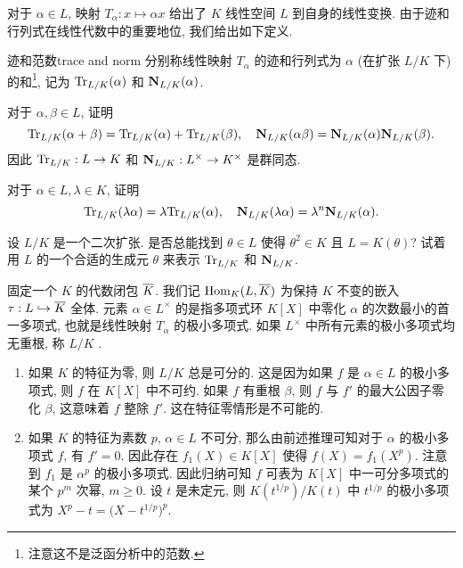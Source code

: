 对于 $\alpha\in L$, 映射 $T_\alpha:x\mapsto \alpha x$ 给出了 $K$ 线性空间 $L$ 到自身的线性变换.
由于迹和行列式在线性代数中的重要地位, 我们给出如下定义.

\begin{definition}{迹和范数}{trace and norm}
分别称线性映射 $T_\alpha$ 的迹和行列式为 $\alpha$ (在扩张 $L/K$ 下)的和\footnote{注意这不是泛函分析中的范数.}, 记为 ${\mathrm{Tr}}_{L/K}(\alpha)$ 和 ${\mathbf{N}}_{L/K}(\alpha)$.
\end{definition}

\begin{exercise}
对于 $\alpha,\beta\in L$, 证明
  \[{\mathrm{Tr}}_{L/K}(\alpha+\beta)={\mathrm{Tr}}_{L/K}(\alpha)+{\mathrm{Tr}}_{L/K}(\beta),\quad
  {\mathbf{N}}_{L/K}(\alpha\beta)={\mathbf{N}}_{L/K}(\alpha){\mathbf{N}}_{L/K}(\beta).\]
因此 ${\mathrm{Tr}}_{L/K}:L\to K$ 和 ${\mathbf{N}}_{L/K}:L^\times\to K^\times$ 是群同态.
\end{exercise}

\begin{exercise}
对于 $\alpha\in L,\lambda\in K$, 证明
  \[{\mathrm{Tr}}_{L/K}(\lambda\alpha)=\lambda{\mathrm{Tr}}_{L/K}(\alpha),\quad
  {\mathbf{N}}_{L/K}(\lambda\alpha)=\lambda^n{\mathbf{N}}_{L/K}(\alpha).\]
\end{exercise}

\begin{exercise}
设 $L/K$ 是一个二次扩张. 是否总能找到 $\theta\in L$ 使得 $\theta^2\in K$ 且 $L=K(\theta)$? 试着用 $L$ 的一个合适的生成元 $\theta$ 来表示 ${\mathrm{Tr}}_{L/K}$ 和 ${\mathbf{N}}_{L/K}$.
\end{exercise}

固定一个 $K$ 的代数闭包 $\overline K$. 我们记 ${\mathrm{Hom}}_K(L,\overline K)$ 为保持 $K$ 不变的嵌入 $\tau:L\hookrightarrow\overline K$ 全体. 元素 $\alpha\in L^\times$ 的是指多项式环 $K[X]$ 中零化 $\alpha$ 的次数最小的首一多项式, 也就是线性映射 $T_\alpha$ 的极小多项式. 如果 $L^\times$ 中所有元素的极小多项式均无重根, 称 $L/K$ . 
\begin{example}
  \begin{enumerate}
    \item 如果 $K$ 的特征为零, 则 $L/K$ 总是可分的. 这是因为如果 $f$ 是 $\alpha\in L$ 的极小多项式, 则 $f$ 在 $K[X]$ 中不可约. 如果 $f$ 有重根 $\beta$, 则 $f$ 与 $f'$ 的最大公因子零化 $\beta$, 这意味着 $f$ 整除 $f'$. 这在特征零情形是不可能的.
    \item 如果 $K$ 的特征为素数 $p$, $\alpha\in L$ 不可分, 那么由前述推理可知对于 $\alpha$ 的极小多项式 $f$, 有 $f'=0$. 因此存在 $f_1(X)\in K[X]$ 使得 $f(X)=f_1(X^p)$.
    注意到 $f_1$ 是 $\alpha^p$ 的极小多项式. 因此归纳可知 $f$ 可表为 $K[X]$ 中一可分多项式的某个 $p^m$ 次幂, $m\ge 0$.
    设 $t$ 是未定元, 则 $K(t^{1/p})/K(t)$ 中 $t^{1/p}$ 的极小多项式为 $X^p-t=\bigl(X-t^{1/p}\bigr)^p$.
  \end{enumerate}
\end{example}

